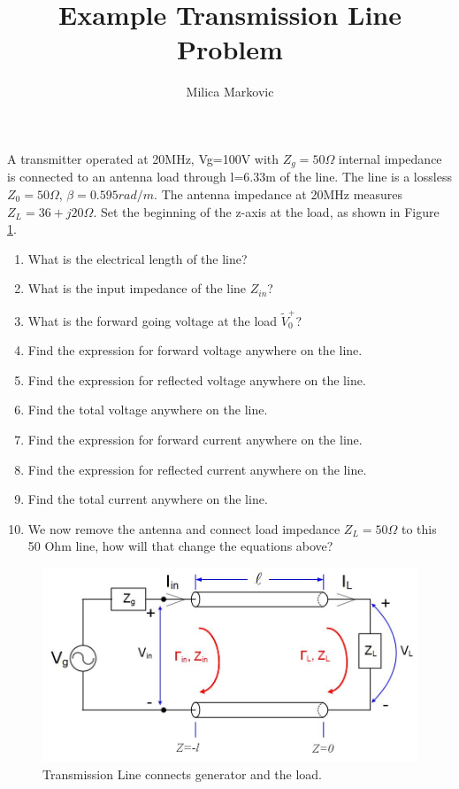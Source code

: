 \documentclass{ximera}
\title{Example Transmission Line Problem}
\author{Milica Markovic}
\begin{document}
  
\begin{abstract}  

\end{abstract}  
\maketitle    


\begin{example}

A transmitter operated at 20MHz, Vg=100V with $Z_g=50 \Omega$ internal impedance is connected to an antenna load through l=6.33m of the line. The line is a lossless $Z_0=50 \Omega$, $\beta=0.595rad/m$. The antenna impedance at 20MHz measures $Z_L=36+j20 \Omega$. Set the beginning of the z-axis at the load, as shown in Figure \ref{fig:TRLine}.
\begin{enumerate}
\item What is the electrical length of the line? 
\item What is the input impedance of the line $Z_{in}$?
\item What is the forward going voltage at the load $\tilde{V}_0^+$?
\item Find the expression for forward voltage anywhere on the line.
\item Find the expression for reflected voltage anywhere on the line.
\item Find the total voltage anywhere on the line.
\item Find the expression for forward current anywhere on the line.
\item Find the expression for reflected current anywhere on the line.
\item Find the total current anywhere on the line.
\item We now remove the antenna and connect load impedance $Z_L=50 \Omega$ to this 50 Ohm line, how will that change the equations above?
\end{enumerate}




\begin{figure}[htbp]
\begin{center}
\includegraphics[scale=0.3]{../jpg/trline.jpg}
\end{center}
\caption{Transmission Line connects generator and the load.}
\label{fig:TRLine}
\end{figure}



\end{example}
\end{document}
